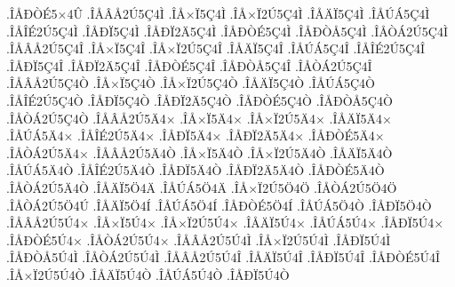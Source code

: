 {.^^ce^^c5^^d0^^d2^^c95^^d74^^db
.^^ce^^c5^^c2^^c52^^da5^^c74^^cc
.^^ce^^c5^^d7^^cf5^^c74^^cc
.^^ce^^c5^^d7^^cf2^^da5^^c74^^cc
.^^ce^^c5^^c4^^cf5^^c74^^cc
.^^ce^^c5^^da^^c15^^c74^^cc
.^^ce^^c5^^ce^^c92^^da5^^c74^^cc
.^^ce^^c5^^d0^^cf5^^c74^^cc
.^^ce^^c5^^d0^^cf2^^c45^^c74^^cc
.^^ce^^c5^^d0^^d2^^c95^^c74^^cc
.^^ce^^c5^^d0^^d2^^c55^^c74^^cc
.^^ce^^c5^^d2^^c12^^da5^^c74^^cc
.^^ce^^c5^^c2^^c52^^da5^^c74^^ce
.^^ce^^c5^^d7^^cf5^^c74^^ce
.^^ce^^c5^^d7^^cf2^^da5^^c74^^ce
.^^ce^^c5^^c4^^cf5^^c74^^ce
.^^ce^^c5^^da^^c15^^c74^^ce
.^^ce^^c5^^ce^^c92^^da5^^c74^^ce
.^^ce^^c5^^d0^^cf5^^c74^^ce
.^^ce^^c5^^d0^^cf2^^c45^^c74^^ce
.^^ce^^c5^^d0^^d2^^c95^^c74^^ce
.^^ce^^c5^^d0^^d2^^c55^^c74^^ce
.^^ce^^c5^^d2^^c12^^da5^^c74^^ce
.^^ce^^c5^^c2^^c52^^da5^^c74^^d2
.^^ce^^c5^^d7^^cf5^^c74^^d2
.^^ce^^c5^^d7^^cf2^^da5^^c74^^d2
.^^ce^^c5^^c4^^cf5^^c74^^d2
.^^ce^^c5^^da^^c15^^c74^^d2
.^^ce^^c5^^ce^^c92^^da5^^c74^^d2
.^^ce^^c5^^d0^^cf5^^c74^^d2
.^^ce^^c5^^d0^^cf2^^c45^^c74^^d2
.^^ce^^c5^^d0^^d2^^c95^^c74^^d2
.^^ce^^c5^^d0^^d2^^c55^^c74^^d2
.^^ce^^c5^^d2^^c12^^da5^^c74^^d2
.^^ce^^c5^^c2^^c52^^da5^^c44^^d7
.^^ce^^c5^^d7^^cf5^^c44^^d7
.^^ce^^c5^^d7^^cf2^^da5^^c44^^d7
.^^ce^^c5^^c4^^cf5^^c44^^d7
.^^ce^^c5^^da^^c15^^c44^^d7
.^^ce^^c5^^ce^^c92^^da5^^c44^^d7
.^^ce^^c5^^d0^^cf5^^c44^^d7
.^^ce^^c5^^d0^^cf2^^c45^^c44^^d7
.^^ce^^c5^^d0^^d2^^c95^^c44^^d7
.^^ce^^c5^^d2^^c12^^da5^^c44^^d7
.^^ce^^c5^^c2^^c52^^da5^^c44^^d2
.^^ce^^c5^^d7^^cf5^^c44^^d2
.^^ce^^c5^^d7^^cf2^^da5^^c44^^d2
.^^ce^^c5^^c4^^cf5^^c44^^d2
.^^ce^^c5^^da^^c15^^c44^^d2
.^^ce^^c5^^ce^^c92^^da5^^c44^^d2
.^^ce^^c5^^d0^^cf5^^c44^^d2
.^^ce^^c5^^d0^^cf2^^c45^^c44^^d2
.^^ce^^c5^^d0^^d2^^c95^^c44^^d2
.^^ce^^c5^^d2^^c12^^da5^^c44^^d2
.^^ce^^c5^^c4^^cf5^^d64^^c4
.^^ce^^c5^^da^^c15^^d64^^c4
.^^ce^^c5^^d7^^cf2^^da5^^d64^^d6
.^^ce^^c5^^d2^^c12^^da5^^d64^^d6
.^^ce^^c5^^d2^^c12^^da5^^d64^^da
.^^ce^^c5^^c4^^cf5^^d64^^cd
.^^ce^^c5^^da^^c15^^d64^^cd
.^^ce^^c5^^d0^^d2^^c95^^d64^^cd
.^^ce^^c5^^da^^c15^^d64^^d2
.^^ce^^c5^^d0^^cf5^^d64^^d2
.^^ce^^c5^^c2^^c52^^da5^^da4^^d7
.^^ce^^c5^^d7^^cf5^^da4^^d7
.^^ce^^c5^^d7^^cf2^^da5^^da4^^d7
.^^ce^^c5^^c4^^cf5^^da4^^d7
.^^ce^^c5^^da^^c15^^da4^^d7
.^^ce^^c5^^d0^^cf5^^da4^^d7
.^^ce^^c5^^d0^^d2^^c95^^da4^^d7
.^^ce^^c5^^d2^^c12^^da5^^da4^^d7
.^^ce^^c5^^c2^^c52^^da5^^da4^^cc
.^^ce^^c5^^d7^^cf2^^da5^^da4^^cc
.^^ce^^c5^^d0^^cf5^^da4^^cc
.^^ce^^c5^^d0^^d2^^c55^^da4^^cc
.^^ce^^c5^^d2^^c12^^da5^^da4^^cc
.^^ce^^c5^^c2^^c52^^da5^^da4^^ce
.^^ce^^c5^^c4^^cf5^^da4^^ce
.^^ce^^c5^^d0^^cf5^^da4^^ce
.^^ce^^c5^^d0^^d2^^c95^^da4^^ce
.^^ce^^c5^^d7^^cf2^^da5^^da4^^d2
.^^ce^^c5^^c4^^cf5^^da4^^d2
.^^ce^^c5^^da^^c15^^da4^^d2
.^^ce^^c5^^d0^^cf5^^da4^^d2
}

